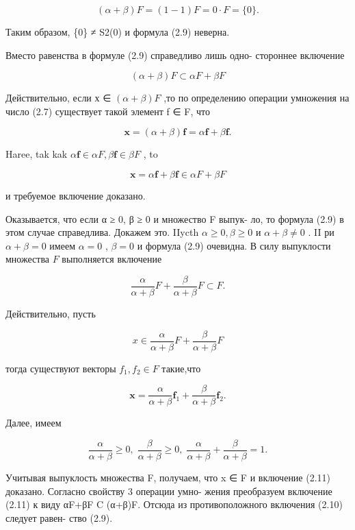 \documentclass[8pt]{extarticle}
\begin{document}
\[
\left( {\alpha  + \beta }\right) F = \left( {1 - 1}\right) F = 0 \cdot  F = \{ 0\} .
\]

Таким образом, \{0\} ≠ S2(0) и формула (2.9) неверна.

Вместо равенства в формуле (2.9) справедливо лишь одно- стороннее включение

\[
\left( {\alpha  + \beta }\right) F \subset  {\alpha F} + {\beta F} \tag{2.10}
\]

Действительно, если х ∈ \(\left( {\alpha  + \beta }\right) F\) ,то по определению операции умножения на число (2.7) существует такой элемент f ∈ F, что

\[
\mathbf{x} = \left( {\alpha  + \beta }\right) \mathbf{f} = \alpha \mathbf{f} + \beta \mathbf{f}.
\]

Haree, tak kak \(\alpha \mathbf{f} \in  {\alpha F},\beta \mathbf{f} \in  {\beta F}\) , to

\[
\mathbf{x} = \alpha \mathbf{f} + \beta \mathbf{f} \in  {\alpha F} + {\beta F}
\]

и требуемое включение доказано.

Оказывается, что если α ≥ 0, β ≥ 0 и множество F выпук- ло, то формула (2.9) в этом случае справедлива. Докажем это. IIycth \(\alpha  \geq  0,\beta  \geq  0\) и \(\alpha  + \beta  \neq  0\) . II ри \(\alpha  + \beta  = 0\) имеем \(\alpha  = 0\) , \(\beta  = 0\) и формула (2.9) очевидна. В силу выпуклости множества \(F\) выполняется включение

\[
\frac{\alpha }{\alpha  + \beta }F + \frac{\beta }{\alpha  + \beta }F \subset  F. \tag{2.11}
\]

Действительно, пусть

\[
x \in  \frac{\alpha }{\alpha  + \beta }F + \frac{\beta }{\alpha  + \beta }F
\]

тогда существуют векторы \({f}_{1},{f}_{2} \in  F\) такие,что

\[
\mathbf{x} = \frac{\alpha }{\alpha  + \beta }{\mathbf{f}}_{1} + \frac{\beta }{\alpha  + \beta }{\mathbf{f}}_{2}.
\]

Далее, имеем

\[
\frac{\alpha }{\alpha  + \beta } \geq  0,\;\frac{\beta }{\alpha  + \beta } \geq  0,\;\frac{\alpha }{\alpha  + \beta } + \frac{\beta }{\alpha  + \beta } = 1.
\]

Учитывая выпуклость множества F, получаем, что x ∈ F и включение (2.11) доказано. Согласно свойству 3 операции умно- жения преобразуем включение (2.11) к виду αF+βF C (α+β)F. Отсюда из противоположного включения (2.10) следует равен- ство (2.9).
\end{document}
